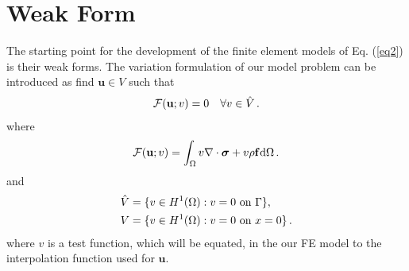 \documentclass[]{article}
\begin{document}
\section{Weak Form} \label{sec: wf}
The starting point for the development of the finite element models of Eq. (\ref{eq2}) is their weak forms. The variation formulation of our model problem can be introduced as find $\mathbf{u} \in V$ such that
\begin{equation}\label{eq4}
	\begin{aligned}
		\mathcal{F}(\mathbf{u};v) = 0 \quad \forall v \in \hat{V}\thinspace.
	\end{aligned}
\end{equation}
where
\begin{equation}\label{eq5}
	\begin{aligned}
		\mathcal{F}(\mathbf{u}; v) =\int_{\Omega} v\nabla \cdot \boldsymbol{\sigma} + v \rho \mathbf{f}\mathrm{d}\Omega \thinspace .
	\end{aligned}
\end{equation}
and
\begin{equation}\label{eq6}
	\begin{aligned}
		\hat{V} &= \{v \in H^1(\Omega) : v = 0 \text{ on } \Gamma\}, \\
		V &= \{v \in H^1(\Omega) : v = 0 \text{ on } x=0\}\thinspace.
	\end{aligned}
\end{equation}
where $v$ is a test function, which will be equated, in the our FE model to the interpolation function used for $\mathbf{u}$.
\end{document}
